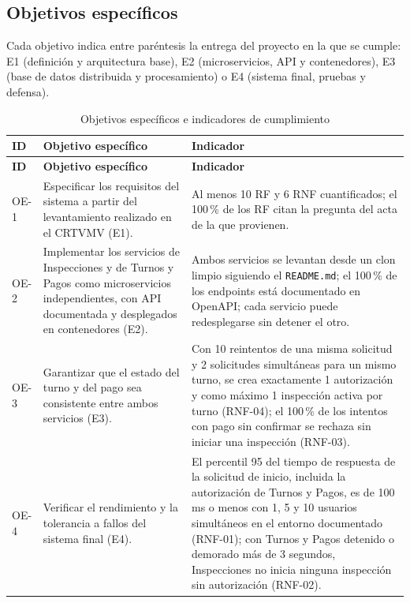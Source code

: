 \documentclass[11pt,a4paper]{article}
\begin{document}
	\subsection{Objetivos específicos}
	Cada objetivo indica entre paréntesis la entrega del proyecto en la que se cumple: E1 (definición y arquitectura base), E2 (microservicios, API y contenedores), E3 (base de datos distribuida y procesamiento) o E4 (sistema final, pruebas y defensa).
	\begin{xltabular}{\textwidth}{lXL{5.2cm}}
		\caption{Objetivos específicos e indicadores de cumplimiento}\label{tab:objetivos}\\
		\toprule
		\textbf{ID} & \textbf{Objetivo específico} & \textbf{Indicador} \\
		\midrule
		\endfirsthead
		\toprule
		\textbf{ID} & \textbf{Objetivo específico} & \textbf{Indicador} \\
		\midrule
		\endhead
		\bottomrule
		\endfoot
		OE-1 & Especificar los requisitos del sistema a partir del levantamiento realizado en el CRTVMV (E1). & Al menos 10 RF y 6 RNF cuantificados; el 100\,\% de los RF citan la pregunta del acta de la que provienen. \\
		OE-2 & Implementar los servicios de Inspecciones y de Turnos y Pagos como microservicios independientes, con API documentada y desplegados en contenedores (E2). & Ambos servicios se levantan desde un clon limpio siguiendo el \texttt{README.md}; el 100\,\% de los endpoints está documentado en OpenAPI; cada servicio puede redesplegarse sin detener el otro. \\
		OE-3 & Garantizar que el estado del turno y del pago sea consistente entre ambos servicios (E3). & Con 10 reintentos de una misma solicitud y 2 solicitudes simultáneas para un mismo turno, se crea exactamente 1 autorización y como máximo 1 inspección activa por turno (RNF-04); el 100\,\% de los intentos con pago sin confirmar se rechaza sin iniciar una inspección (RNF-03). \\
		OE-4 & Verificar el rendimiento y la tolerancia a fallos del sistema final (E4). & El percentil 95 del tiempo de respuesta de la solicitud de inicio, incluida la autorización de Turnos y Pagos, es de 100 ms o menos con 1, 5 y 10 usuarios simultáneos en el entorno documentado (RNF-01); con Turnos y Pagos detenido o demorado más de 3 segundos, Inspecciones no inicia ninguna inspección sin autorización (RNF-02). \\
	\end{xltabular}
	
\end{document}
